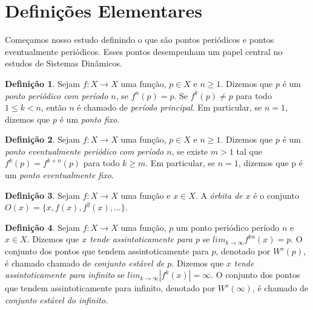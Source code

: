 \documentclass[a4paper, 12pt]{article}
\theoremstyle{definition}
\newtheorem{definition}{Definição}[section]
\theoremstyle{plain}
\theoremstyle{plain}
\theoremstyle{plain}
\theoremstyle{remark}
\newcommand{\RR}{\mathbb{R}}
\begin{document}
\section{Definições Elementares}

Começamos nosso estudo definindo o que são pontos periódicos e pontos eventualmente periódicos. Esses pontos desempenham um papel central no estudos de Sistemas Dinâmicos.
 
\begin{definition}
Sejam $f: X \rightarrow X$ uma função, $p \in X$ e $n \geq 1$.  Dizemos que $p$ é um \textit{ponto periódico com período $n$}, se $f^n(p) = p$. Se $f^k(p) \neq p$ para todo $1 \leq k < n$, então $n$ é chamado de \textit{período principal}. Em particular, se $n=1$, dizemos que $p$ é um \textit{ponto fixo}.%
\end{definition}

\begin{definition}
Sejam $f: X \rightarrow X$ uma função, $p \in X$ e $n \geq 1$. Dizemos que $p$ é um \textit{ponto eventualmente periódico com período $n$}, se existe $m > 1$ tal que $f^k(p) = f^{k+n}(p)$ para todo $k \geq m$. Em particular, se $n = 1$, dizemos que p é um \textit{ponto eventualmente fixo}.
\end{definition}

\begin{definition}
Sejam $f:X \rightarrow X$ uma função e $x \in X$. A \textit{órbita de $x$} é o conjunto $O(x) = \lbrace x, f(x), f^2(x), \dots \rbrace$.
\end{definition}

\begin{definition}
Sejam $f: X \rightarrow X$ uma função, $p$ um ponto periódico período $n$ e $x \in X$. Dizemos que \textit{$x$ tende assintoticamente para $p$} se $lim_{k \rightarrow \infty} f^{kn}(x) = p$. O conjunto dos pontos que tendem assintoticamente para $p$, denotado por $W^s(p)$, é chamado chamado de \textit{conjunto estável de $p$}. Dizemos que \textit{$x$ tende assintoticamente para infinito} se $lim_{k \rightarrow \infty} |f^{k}(x)| = \infty$. O conjunto dos pontos que tendem assintoticamente para infinito, denotado por $W^s(\infty)$, é chamado de \textit{conjunto estável do infinito}.
\end{definition}
\end{document}
